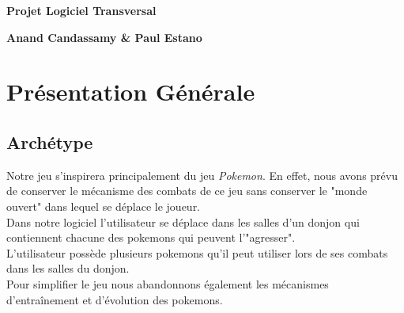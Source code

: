 \documentclass[a4paper,12pt]{article}
\begin{document}
    \thispagestyle{empty}

    \begin{titlepage}

        \vspace*{2cm}

        \begin{center}\textbf{\Huge Projet Logiciel Transversal}\end{center}{\Large \par}

        \begin{center}\textbf{\large Anand Candassamy \& Paul Estano}\end{center}{\large \par}

        \vspace{2cm}


        \clearpage

        {\small
        \tableofcontents
        }

    \end{titlepage}

    \clearpage
    \section{Présentation Générale}

    \subsection{Archétype}
    Notre jeu s'inspirera principalement du jeu \emph{Pokemon}. En effet, nous avons prévu de conserver le mécanisme des combats de ce jeu sans conserver le "monde ouvert" dans lequel se déplace le joueur.
    \\Dans notre logiciel l'utilisateur se déplace dans les salles d'un donjon qui contiennent chacune des pokemons qui peuvent l'"agresser".
    \\L'utilisateur possède plusieurs pokemons qu'il peut utiliser lors de ses combats dans les salles du donjon.
    \\Pour simplifier le jeu nous abandonnons également les mécanismes d'entraînement et d'évolution des pokemons.
\end{document}

